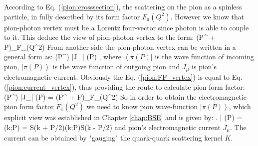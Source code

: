 According to Eq. (\ref{pion:crosssection}), the scattering on the pion as a spinless particle, in fully described by its form factor $F_\pi(Q^2)$. However we know that pion-photon vertex must be a Lorentz four-vector since photon is able to couple to it. This deduce the view of pion-photon vertex to the form:
\beqa
	(P^{\prime} + P)_\mu F_\pi(Q^2)
	\label{pion:FF_vertex}
\eeqa
From another side the pion-photon vertex can be written in a general form as:
\beqa
	\left\langle \pi(P^{\prime}) |J_\mu | \pi(P) \right\rangle\;,
	\label{pion:current_vertex}
\eeqa
where $\left\langle \pi(P) |\right. $ is the wave function of incoming pion, $\left. | \pi(P) \right\rangle $ is the wave function of outgoing pion and $J_\mu$ is pion's electromagnetic current. Obviously the Eq. (\ref{pion:FF_vertex}) is equal to Eq. (\ref{pion:current_vertex}), thus providing the route to calculate pion form factor:
\beqa
	\left\langle \pi(P^{\prime}) |J_\mu | \pi(P) \right\rangle = (P^{\prime} + P)_\mu F_\pi(Q^2)
	\label{pion:FF_relation}
\eeqa
So in order to obtain the electromagnetic pion form factor $F_\pi(Q^2)$ we need to know pion wave-function $\left. | \pi(P) \right\rangle$, which explicit view was established in Chapter \ref{chap:BSE} and is given by:
\beqa
	\left. | \pi(P) \right\rangle = \chi(k;P) = S(k + P/2)\Gamma(k;P)S(k - P/2)
\eeqa
and pion's electromagnetic current $J_\mu$. The current can be obtained by "gauging" the quark-quark scattering kernel $K$. \\

